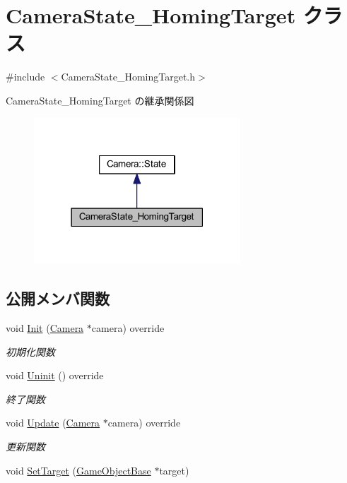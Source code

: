 \hypertarget{class_camera_state___homing_target}{}\section{Camera\+State\+\_\+\+Homing\+Target クラス}
\label{class_camera_state___homing_target}


{\ttfamily \#include $<$Camera\+State\+\_\+\+Homing\+Target.\+h$>$}



Camera\+State\+\_\+\+Homing\+Target の継承関係図\nopagebreak
\begin{figure}[H]
\begin{center}
\leavevmode
\includegraphics[width=219pt]{class_camera_state___homing_target__inherit__graph}
\end{center}
\end{figure}
\subsection*{公開メンバ関数}
\begin{DoxyCompactItemize}
\item 
void \mbox{\hyperlink{class_camera_state___homing_target_a9222190a5f26d564e99623b05941d382}{Init}} (\mbox{\hyperlink{class_camera}{Camera}} $\ast$camera) override
\begin{DoxyCompactList}\small\item\em 初期化関数 \end{DoxyCompactList}\item 
void \mbox{\hyperlink{class_camera_state___homing_target_ab2b5379b35ebafc53189bf4d45646c8c}{Uninit}} () override
\begin{DoxyCompactList}\small\item\em 終了関数 \end{DoxyCompactList}\item 
void \mbox{\hyperlink{class_camera_state___homing_target_a98f04985c06033febdad32d6357088c9}{Update}} (\mbox{\hyperlink{class_camera}{Camera}} $\ast$camera) override
\begin{DoxyCompactList}\small\item\em 更新関数 \end{DoxyCompactList}\item 
void \mbox{\hyperlink{class_camera_state___homing_target_a5beacf25aaff9547b5c4e32cec698e28}{Set\+Target}} (\mbox{\hyperlink{class_game_object_base}{Game\+Object\+Base}} $\ast$target)
\end{DoxyCompactItemize}
